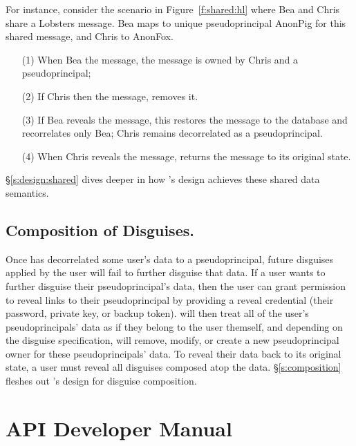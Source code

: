 %
For instance, consider the scenario in Figure~\ref{f:shared:hl} where Bea and
Chris share a Lobsters message. Bea maps to unique pseudoprincipal AnonPig for this
shared message, and Chris to AnonFox.
\begin{enumerate}[nosep]
    \item[(1)] When Bea \xxs the message, the message is owned by
Chris and a pseudoprincipal;
    \item[(2)] If Chris then \xxs the message, \sys removes it.
    \item[(3)] If Bea reveals the message, this restores the message to the database
and recorrelates only Bea; Chris remains decorrelated as a pseudoprincipal.
\item[(4)] When Chris reveals the message, \sys returns
the message to its original state.
\end{enumerate}
%
\S\ref{s:design:shared} dives deeper in how \sys's design achieves these shared
data semantics.

\subsection{Composition of Disguises.}
Once \sys has decorrelated some user's data to a pseudoprincipal, future
disguises applied by the user will fail to further disguise that data.
%
If a user wants to further disguise their pseudoprincipal's data, then the user
can grant \sys permission to reveal links to their pseudoprincipal by providing
a reveal credential (their password, private key, or backup token). 
%
\sys will then treat all of the user's pseudoprincipals' data as if they belong
to the user themself, and depending on the disguise specification, will remove,
modify, or create a new pseudoprincipal owner for these pseudoprincipals' data.
%
To reveal their data back to its original state, a user must reveal all
disguises composed atop the data.
%
\S\ref{s:composition} fleshes out \sys's design for disguise composition.

%
\section{API Developer Manual}
\label{s:api}

